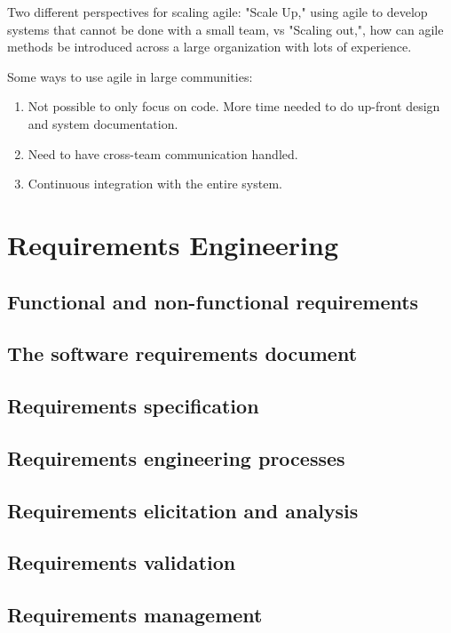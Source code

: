 \documentclass{article}
\begin{document}
Two different perspectives for scaling agile: "Scale Up," using agile to develop systems that cannot be done with a small team, vs "Scaling out,", how can agile methods be introduced across a large organization with lots of experience.

Some ways to use agile in large communities:
\begin{enumerate}
    \item Not possible to only focus on code.  More time needed to do up-front design and system documentation.
    \item Need to have cross-team communication handled.
    \item Continuous integration with the entire system.
\end{enumerate}

\section{Requirements Engineering}
\subsection{Functional and non-functional requirements}
\subsection{The software requirements document}
\subsection{Requirements specification}
\subsection{Requirements engineering processes}
\subsection{Requirements elicitation and analysis}
\subsection{Requirements validation}
\subsection{Requirements management}
\end{document}
